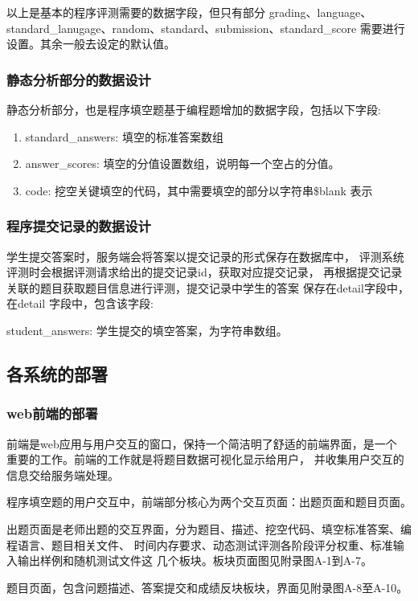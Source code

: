 以上是基本的程序评测需要的数据字段，但只有部分 grading、language、
standard\_lanugage、random、standard、submission、standard\_score 需要进行
设置。其余一般去设定的默认值。

\subsubsection{静态分析部分的数据设计}
静态分析部分，也是程序填空题基于编程题增加的数据字段，包括以下字段:

\begin{enumerate}
  \item standard\_answers: 填空的标准答案数组
  \item answer\_scores: 填空的分值设置数组，说明每一个空占的分值。
  \item code: 挖空关键填空的代码，其中需要填空的部分以字符串\$blank 表示
\end{enumerate}

\subsubsection{程序提交记录的数据设计}
学生提交答案时，服务端会将答案以提交记录的形式保存在数据库中，
评测系统评测时会根据评测请求给出的提交记录id，获取对应提交记录，
再根据提交记录关联的题目获取题目信息进行评测，提交记录中学生的答案
保存在detail字段中，
在detail 字段中，包含该字段:

student\_answers: 学生提交的填空答案，为字符串数组。

\subsection{各系统的部署}

\subsubsection{web前端的部署}
前端是web应用与用户交互的窗口，保持一个简洁明了舒适的前端界面，是一个
重要的工作。前端的工作就是将题目数据可视化显示给用户，
并收集用户交互的信息交给服务端处理。

程序填空题的用户交互中，前端部分核心为两个交互页面：出题页面和题目页面。

出题页面是老师出题的交互界面，分为题目、描述、挖空代码、填空标准答案、编程语言、题目相关文件、
时间内存要求、动态测试评测各阶段评分权重、标准输入输出样例和随机测试文件这
几个板块。板块页面图见附录图A-1到A-7。

题目页面，包含问题描述、答案提交和成绩反块板块，界面见附录图A-8至A-10。

